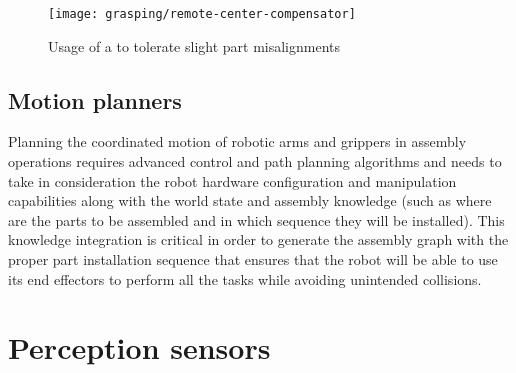 \begin{figure}[H]
	\centering
	\texttt{[image: grasping/remote-center-compensator]}
	\caption[Usage of a  to tolerate slight part misalignments]{Usage of a  to tolerate slight part misalignments\protect\footnotemark}
	\label{fig:remote-center-compensator}
\end{figure}


\subsection{Motion planners}

Planning the coordinated motion of robotic arms \cite{Rickert2011} and grippers in assembly operations requires advanced control \cite{Stolt2015} and path planning algorithms \cite{Kuffner2000,You2012,Fontanals2014,mopl2015} and needs to take in consideration the robot hardware configuration and manipulation capabilities along with the world state and assembly knowledge \cite{Tenorth14} (such as where are the parts to be assembled and in which sequence they will be installed). This knowledge integration is critical in order to generate the assembly graph with the proper part installation sequence that ensures that the robot will be able to use its end effectors to perform all the tasks \cite{Thomas2003ATP,Thomas2011} while avoiding unintended collisions.





\section{Perception sensors}

